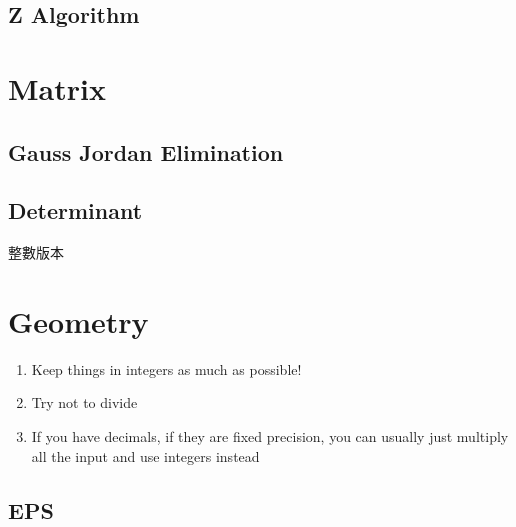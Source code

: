 \documentclass[10pt,oneside]{article}
\begin{document}
\begin{landscape}
\begin{multicols}{2}

\subsection{Z Algorithm}



\section{Matrix}

\subsection{Gauss Jordan Elimination}

\subsection{Determinant}

{\normalsize 
整數版本
}



\section{Geometry}

{\normalsize 
\begin{enumerate}
	\item Keep things in integers as much as possible!
	\item Try not to divide
	\item If you have decimals, if they are fixed precision, you can usually just multiply all the input and use integers instead
\end{enumerate}
}

\subsection{EPS}


\end{multicols}
\end{landscape}
\end{document}

